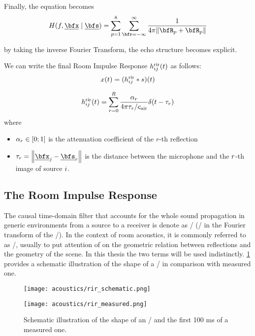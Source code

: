 
Finally, the equation becomes
\begin{equation}
    \label{eq:acoustics:ims:frourier}
    H(f, \positionMicrophone \mid \positionSource) =
        \sum_{p=1}^{8}
            \sum_{\pos=-\infty}^{\infty}
                \frac{1}{4 \pi \norm{\coordinatePermutation_p +  \coordinatePermutation_p}}
\end{equation}

by taking the inverse Fourier Transform, the echo structure becomes explicit.

We can write the final Room Impulse Response $h^{\text{rir}}_{ij}(t)$ as follows:
\begin{equation}
    x(t) = (h^{\text{rir}}_{ij} \ast s)(t)
\end{equation}

\begin{equation}
    \rir_{ij}(t) = \sum_{r=0}^{R} \frac{\alpha_r}{4 \pi \tau_r / \cair} \delta \kparen{t - \tau_r}
\end{equation}
where
\begin{itemize}
    \item $\alpha_r \in \kintervcc{0}{1}$ is the attenuation coefficient of the $r$-th reflection
    \item $\tau_r = \norm{\positionMicrophone_\idxMic - \positionSource_\idxEch}$ is the distance between the microphone and the $r$-th image of source $i$.
\end{itemize}

\subsection{The Room Impulse Response}\label{ch:acoustics:subsec:rir}
The causal time-domain filter that accounts for the whole sound propagation in generic
environments from a source to a receiver is denote as \AIRdef/ (\ATFdef/ in the Fourier transform of the \AIR/).
In the context of room acoustics, it is commonly referred to as \RIRdef/, usually to put attention of
on the geometric relation between reflections and the geometry of the scene.
In this thesis the two terms will be used indistinctly.
\cref{fig:acoustics:rir} provides a schematic illustration of the shape of a \RIR/ in comparison with measured one.
\begin{figure}[h]
    \centering
    \begin{minipage}[b]{.5\textwidth}
        \centering
        \texttt{[image: acoustics/rir\_schematic.png]}
    \end{minipage}%
    \begin{minipage}[b]{.5\textwidth}
        \centering
        \texttt{[image: acoustics/rir\_measured.png]}
    \end{minipage}
    \caption{Schematic illustration of the shape of an \RIR/ and the first 100 ms of a measured one.}
    \label{fig:acoustics:rir}
\end{figure}

